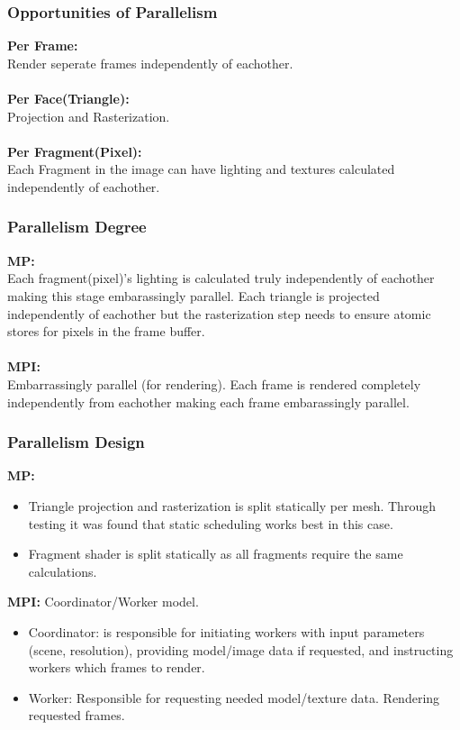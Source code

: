 \documentclass{beamer}
\begin{document}
\begin{frame}
	\frametitle{Opportunities of Parallelism}
	
	\textbf{Per Frame: } \\
	\hspace{1em} Render seperate frames independently of eachother.
	\\~\\

	\textbf{Per Face(Triangle): } \\
	\hspace{1em} Projection and Rasterization.
	\\~\\
	
	\textbf{Per Fragment(Pixel): } \\
	\hspace{1em} Each Fragment in the image can have lighting and textures calculated independently of eachother.
\end{frame}

\begin{frame}
	\frametitle{Parallelism Degree}
	
	\textbf{MP: } \\
		\hspace{1em} Each fragment(pixel)'s lighting is calculated truly independently of eachother making this stage embarassingly parallel. Each triangle is projected independently of eachother but the rasterization step needs to ensure atomic stores for pixels in the frame buffer.\\~\\
	
	\textbf{MPI: } \\
	\hspace{1em} Embarrassingly parallel (for rendering). Each frame is rendered completely independently from eachother making each frame embarassingly parallel. 
\end{frame}

\begin{frame}
	\frametitle{Parallelism Design}
	
	\textbf{MP: } \\
	\begin{itemize}
		\item Triangle projection and rasterization is split statically per mesh. Through testing it was found that static scheduling works best in this case. 
		\item Fragment shader is split statically as all fragments require the same calculations.
	\end{itemize}
	
	
	\textbf{MPI: } Coordinator/Worker model.\\
	\begin{itemize}
		\item Coordinator: is responsible for initiating workers with input parameters (scene, resolution), providing model/image data if requested, and instructing workers which frames to render.
		\item Worker: Responsible for requesting needed model/texture data. Rendering requested frames.
	\end{itemize}
\end{frame}
\end{document}
